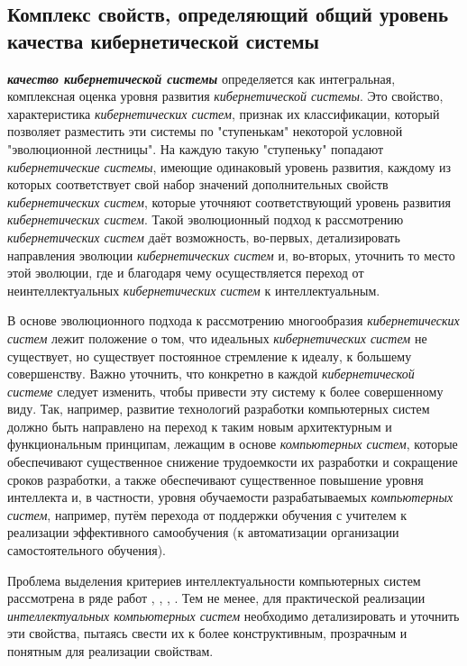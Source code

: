 \subsection{Комплекс свойств, определяющий общий уровень качества кибернетической системы}
{\label{sec_cyb_syst_overall_quality}} 

\textbf{\textit{качество кибернетической системы}} определяется как интегральная, комплексная оценка уровня развития \textit{кибернетической системы}. Это свойство, характеристика \textit{кибернетических систем}, признак их классификации, который позволяет разместить эти системы по "ступенькам"{} некоторой условной "эволюционной лестницы"{}.
На каждую такую "ступеньку"{} попадают \textit{кибернетические системы}, имеющие одинаковый уровень развития, каждому из которых соответствует свой набор значений дополнительных свойств \textit{кибернетических систем}, которые уточняют соответствующий уровень развития \textit{кибернетических систем}. Такой эволюционный подход к рассмотрению \textit{кибернетических систем} даёт возможность, во-первых, детализировать направления эволюции \textit{кибернетических систем} и, во-вторых, уточнить то место этой эволюции, где и благодаря чему осуществляется переход от неинтеллектуальных \textit{кибернетических систем} к интеллектуальным.

В основе эволюционного подхода к рассмотрению многообразия \textit{кибернетических систем} лежит положение о том, что идеальных \textit{кибернетических систем} не существует, но существует постоянное стремление к идеалу, к большему совершенству. 
Важно уточнить, что конкретно в каждой \textit{кибернетической системе} следует изменить, чтобы привести эту систему к более совершенному виду. Так, например, развитие технологий разработки компьютерных систем должно быть направлено на переход к таким новым архитектурным и функциональным принципам, лежащим в основе \textit{компьютерных систем}, которые обеспечивают существенное снижение трудоемкости их разработки и сокращение сроков разработки, а также обеспечивают существенное повышение уровня интеллекта и, в частности, уровня обучаемости разрабатываемых \textit{компьютерных систем}, например, путём перехода от поддержки обучения с учителем к реализации эффективного самообучения (к автоматизации организации самостоятельного обучения). 

Проблема выделения критериев интеллектуальности компьютерных систем рассмотрена в ряде работ , , , . Тем не менее, для практической реализации \textit{интеллектуальных компьютерных систем} необходимо детализировать и уточнить эти свойства, пытаясь свести их к более конструктивным, прозрачным и понятным для реализации свойствам.

